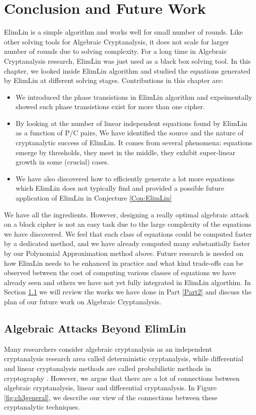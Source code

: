 \section{Conclusion and Future Work}
ElimLin is a simple algorithm and works well for small number of rounds. Like other solving tools for Algebraic Cryptanalysis, it does not scale for larger number of rounds due to solving complexity. For a long time in Algebraic Cryptanalysis research, ElimLin was just used as a black box solving tool. In this chapter, we looked inside ElimLin algorithm and studied the equations generated by ElimLin at different solving stages. Contributions in this chapter are:
\begin{itemize}
	\item We introduced the phase transistions in ElimLin algorithm and expeimentally showed such phase transistions exist for more than one cipher. 
	\item By looking at the number of linear independent equations found by ElimLin as a function of P/C pairs, We have identified the source and the nature of cryptanalytic success of ElimLin. It comes from several phenomena: equations emerge by thresholds, they meet in the middle, they exhibit super-linear growth in some (crucial) cases.
	\item We have also discovered how to efficiently generate a lot more equations which ElimLin does not typically find and provided a possible future application of ElimLin in Conjecture \ref{Con:ElimLin} 
\end{itemize}
We have all the ingredients. However, designing a really optimal algebraic attack on a block cipher is not an easy task due to the large complexity of the equations we have discovered. We feel that each class of equations could be computed faster by a dedicated method, and we have already computed many substantially faster by our Polynomial Approximation method above. Future research is needed on how ElimLin needs to be enhanced in practice and what kind trade-offs can be observed between the cost of computing various classes of equations we have already seen and others we have not yet fully integrated in ElimLin algorthim. In Section \ref{ElimLin+} we will review the works we have done in Part \ref{Part2} and discuss the plan of our future work on Algebraic Cryptanalysis.

\subsection{Algebraic Attacks Beyond ElimLin} \label{ElimLin+}
Many researchers consider algebraic cryptanalysis as an independent cryptanalysis research area called deterministic cryptanalysis, while differential and linear cryptanalysis methods are called probabilistic methods in cryptography \cite{pasalic2009probabilistic}. However, we argue that there are a lot of connections between algebraic cryptanalysis, linear and differential cryptanalysis. In Figure \ref{fig:ch3general}, we describe our view of the connections between these cryptanalytic techniques.

